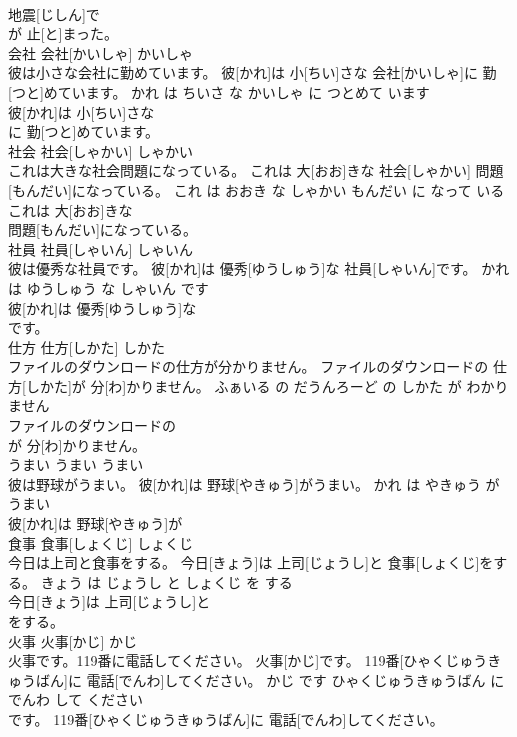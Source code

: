 \documentclass[8pt]{extreport}
\begin{document}
\begin{CJK}{UTF8}{min}
\\	地震[じしん]で
\\	が 止[と]まった。			
\\	会社	会社[かいしゃ]	かいしゃ	
\\	彼は小さな会社に勤めています。	彼[かれ]は 小[ちい]さな 会社[かいしゃ]に 勤[つと]めています。	かれ は ちいさ な かいしゃ に つとめて います	
\\	彼[かれ]は 小[ちい]さな
\\	に 勤[つと]めています。			
\\	社会	社会[しゃかい]	しゃかい	
\\	これは大きな社会問題になっている。	これは 大[おお]きな 社会[しゃかい] 問題[もんだい]になっている。	これ は おおき な しゃかい もんだい に なって いる	
\\	これは 大[おお]きな
\\	問題[もんだい]になっている。			
\\	社員	社員[しゃいん]	しゃいん	
\\	彼は優秀な社員です。	彼[かれ]は 優秀[ゆうしゅう]な 社員[しゃいん]です。	かれ は ゆうしゅう な しゃいん です	
\\	彼[かれ]は 優秀[ゆうしゅう]な
\\	です。			
\\	仕方	仕方[しかた]	しかた	
\\	ファイルのダウンロードの仕方が分かりません。	ファイルのダウンロードの 仕方[しかた]が 分[わ]かりません。	ふぁいる の だうんろーど の しかた が わかりません	
\\	ファイルのダウンロードの
\\	が 分[わ]かりません。			
\\	うまい	うまい	うまい	
\\	彼は野球がうまい。	彼[かれ]は 野球[やきゅう]がうまい。	かれ は やきゅう が うまい	
\\	彼[かれ]は 野球[やきゅう]が
\\	食事	食事[しょくじ]	しょくじ	
\\	今日は上司と食事をする。	今日[きょう]は 上司[じょうし]と 食事[しょくじ]をする。	きょう は じょうし と しょくじ を する	
\\	今日[きょう]は 上司[じょうし]と
\\	をする。			
\\	火事	火事[かじ]	かじ	
\\	火事です。119番に電話してください。	火事[かじ]です。 119番[ひゃくじゅうきゅうばん]に 電話[でんわ]してください。	かじ です ひゃくじゅうきゅうばん に でんわ して ください	
\\	です。 119番[ひゃくじゅうきゅうばん]に 電話[でんわ]してください。			

\end{CJK}
\end{document}
